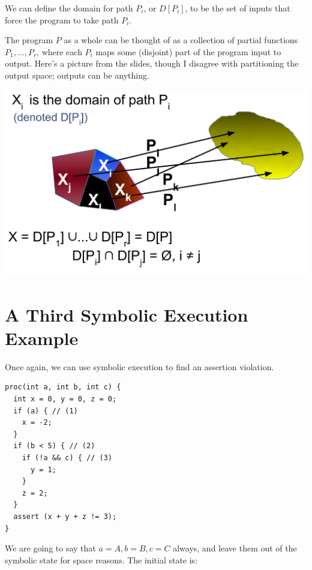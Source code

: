 \documentclass[11pt]{article}
\begin{document}
We can define the domain for path $P_i$, or $D[P_i]$, to be the set of inputs that force the program to take path $P_i$.

The program $P$ as a whole can be thought of as a collection of partial functions $P_1, \ldots, P_r$, where each $P_i$ maps some (disjoint) part of the program input to output.
Here's a picture from the slides, though I disagree with partitioning the output space; outputs can be anything.

\includegraphics[width=.9\textwidth]{L07/partial-function.png}

\section*{A Third Symbolic Execution Example}
Once again, we can use symbolic execution to find an assertion violation.
\begin{lstlisting}
proc(int a, int b, int c) {
  int x = 0, y = 0, z = 0;
  if (a) { // (1)
    x = -2;
  }
  if (b < 5) { // (2)
    if (!a && c) { // (3)
      y = 1;
    }
    z = 2;
  }
  assert (x + y + z != 3);
}
\end{lstlisting}

We are going to say that $a = A, b = B, c = C$ always, and leave them out of the symbolic state for space reasons. The initial state is:
\begin{center}
\end{center}
\end{document}
